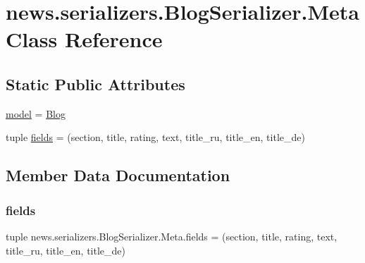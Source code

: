 \hypertarget{classnews_1_1serializers_1_1_blog_serializer_1_1_meta}{}\section{news.\+serializers.\+Blog\+Serializer.\+Meta Class Reference}
\label{classnews_1_1serializers_1_1_blog_serializer_1_1_meta}
\subsection*{Static Public Attributes}
\begin{DoxyCompactItemize}
\item 
\mbox{\hyperlink{classnews_1_1serializers_1_1_blog_serializer_1_1_meta_ab2a309acb0e3758709b853f234dc3f0d}{model}} = \mbox{\hyperlink{classnews_1_1models_1_1_blog}{Blog}}
\item 
tuple \mbox{\hyperlink{classnews_1_1serializers_1_1_blog_serializer_1_1_meta_a0268bed058b50064615f2e10b04f2571}{fields}} = (\textquotesingle{}section\textquotesingle{}, \textquotesingle{}title\textquotesingle{}, \textquotesingle{}rating\textquotesingle{}, \textquotesingle{}text\textquotesingle{}, \textquotesingle{}title\+\_\+ru\textquotesingle{}, \textquotesingle{}title\+\_\+en\textquotesingle{}, \textquotesingle{}title\+\_\+de\textquotesingle{})
\end{DoxyCompactItemize}


\subsection{Member Data Documentation}
\mbox{\label{classnews_1_1serializers_1_1_blog_serializer_1_1_meta_a0268bed058b50064615f2e10b04f2571}} 
\subsubsection{\texorpdfstring{fields}{fields}}
{\footnotesize\ttfamily tuple news.\+serializers.\+Blog\+Serializer.\+Meta.\+fields = (\textquotesingle{}section\textquotesingle{}, \textquotesingle{}title\textquotesingle{}, \textquotesingle{}rating\textquotesingle{}, \textquotesingle{}text\textquotesingle{}, \textquotesingle{}title\+\_\+ru\textquotesingle{}, \textquotesingle{}title\+\_\+en\textquotesingle{}, \textquotesingle{}title\+\_\+de\textquotesingle{})\hspace{0.3cm}{\ttfamily [static]}}

